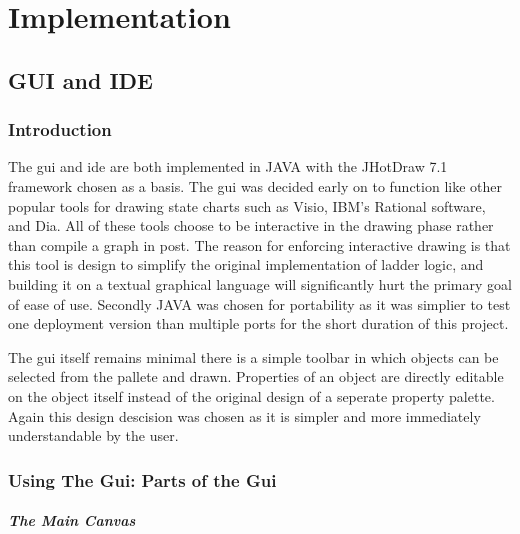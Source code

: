 \section{Implementation}
\subsection{GUI and IDE}
\subsubsection{Introduction}

The gui and ide are both implemented in JAVA with the JHotDraw 7.1 framework chosen as a basis. The gui was decided early on to function like other popular tools for drawing state charts such as Visio, IBM's Rational software, and Dia. All of these tools choose to be interactive in the drawing phase rather than compile a graph in post. The reason for enforcing interactive drawing is that this tool is design to simplify the original implementation of ladder logic, and building it on a textual graphical language will significantly hurt the primary goal of ease of use. Secondly JAVA was chosen for portability as it was simplier to test one deployment version than multiple ports for the short duration of this project.

The gui itself remains minimal %
there is a simple toolbar in which objects can be selected from the pallete and drawn. Properties of an object are directly editable on the object itself %
instead of the original design of a seperate property palette. Again this design descision was chosen as it is simpler and more immediately understandable by the user.

\subsubsection{Using The Gui: Parts of the Gui}

\subparagraph{The Main Canvas}


